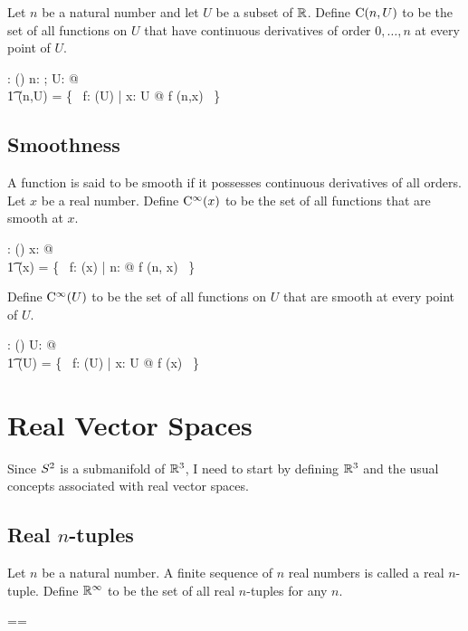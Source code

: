 \documentclass[11pt, oneside]{article}
\begin{document}
Let $n$ be a natural number and let $U$ be a subset of $\mathbb{R}$.
Define $\operatorname{C}(n,U)$ to be the set of all functions on $U$ that have continuous derivatives of order $0, \ldots, n$
at every point of $U$.
\begin{axdef}
	\CnPR: \nat \cross \power \R \fun \power(\R \pfun \R)
\where
	\forall n: \nat; U: \power \R @ \\
	\t1	\CnPR(n,U) = \{~ f: \FunPR(U) | \forall x: U @ f \in \CnR(n,x) ~\}
\end{axdef}

\subsection{Smoothness}

A function is said to be smooth if it possesses continuous derivatives of all orders.
Let $x$ be a real number.
Define $\operatorname{C^{\infty}}(x)$ to be the set of all functions that are smooth at $x$.
\begin{axdef}
	\smoothR: \R \fun \power(\R \pfun \R)
\where
	\forall x: \R @ \\
	\t1	\smoothR(x) = \{~ f: \FunR(x) | \forall n: \nat @ f \in \CnR(n, x) ~\}
\end{axdef}

Define $\operatorname{C^{\infty}}(U)$ to be the set of all functions on $U$ that are smooth at every point of $U$.
\begin{axdef}
	\smoothPR: \power \R \fun \power (\R \pfun \R)
\where
	\forall U: \power \R @ \\
	\t1	\smoothPR(U) = \{~ f: \FunPR(U) | \forall x: U @ f \in \smoothR(x) ~\}
\end{axdef}

\section{Real Vector Spaces}

Since $S^2$ is a submanifold of $\mathbb{R}^3$, I need to start by defining $\mathbb{R}^3$ and the usual concepts 
associated with real vector spaces.

\subsection{Real $n$-tuples}

Let $n$ be a natural number.
A finite sequence of $n$ real numbers is called a real $n$-tuple.
Define $\mathbb{R}^\infty$ to be the set of all real $n$-tuples for any $n$.
\begin{zed}
	\Rinf == \seq \R
\end{zed}
\end{document}

